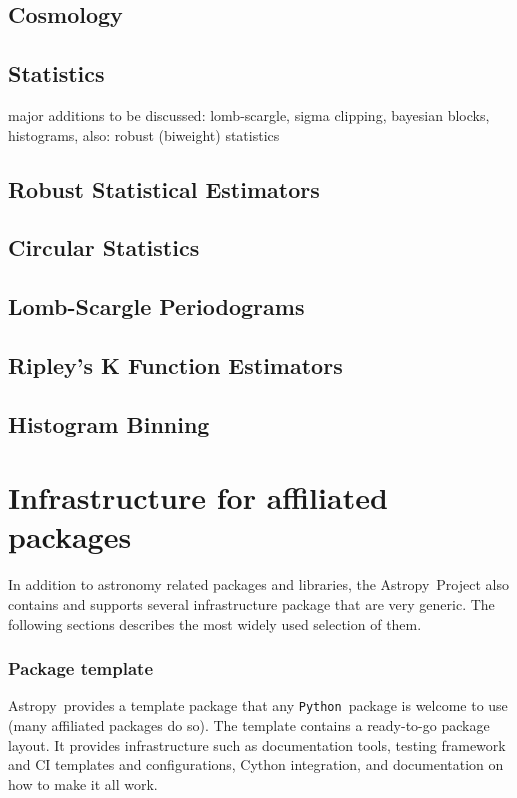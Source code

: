 \documentclass[modern]{aastex61}
\newcommand{\package}[1]{\texttt{#1}}
\newcommand{\python}{\package{Python}}
\newcommand{\astropy}{Astropy}
\begin{document}

\subsection{Cosmology}


\subsection{Statistics}
major additions to be discussed: lomb-scargle, sigma clipping, bayesian blocks, histograms, also:  robust (biweight) statistics

\subsection{Robust Statistical Estimators}
\subsection{Circular Statistics}
\subsection{Lomb-Scargle Periodograms}
\subsection{Ripley's K Function Estimators}
\subsection{Histogram Binning}

\section{Infrastructure for affiliated packages}
\label{sec:infrastructure}
%
\par In addition to astronomy related packages and libraries, the \astropy\
Project also contains and supports several infrastructure package that are
very generic. The following sections describes the most widely used
selection of them.
%
\subsubsection{Package template}
\par \astropy\ provides a template package that any \python\ package is welcome to
use (many affiliated packages do so). The template contains a ready-to-go
package layout. It provides infrastructure such as documentation tools,
testing framework and CI templates and configurations, Cython integration,
and documentation on how to make it all work.
%
\end{document}
